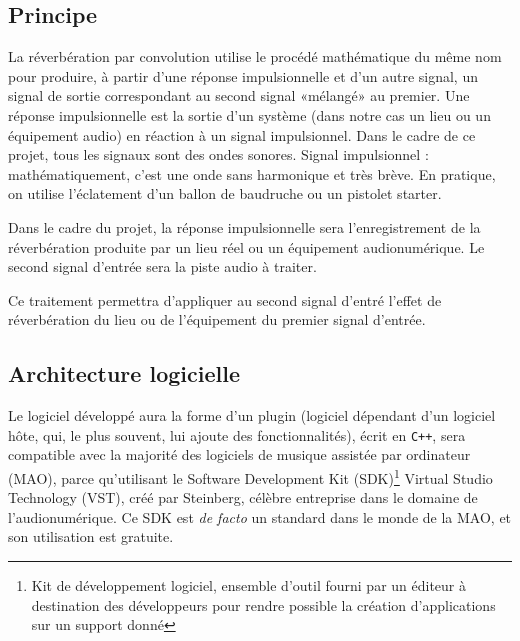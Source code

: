 %
\subsection{Principe}
La réverbération par convolution utilise le procédé mathématique du même nom pour produire, à partir d'une réponse impulsionnelle et d'un autre signal, un signal de sortie correspondant au second signal «mélangé» au premier.
Une réponse impulsionnelle est la sortie d'un système (dans notre cas un lieu ou un équipement audio) en réaction à un signal impulsionnel. Dans le cadre de ce projet, tous les signaux sont des ondes sonores.
Signal impulsionnel : mathématiquement, c'est une onde sans harmonique et très brève. En pratique, on utilise l'éclatement d'un ballon de baudruche ou un pistolet starter.

Dans le cadre du projet, la réponse impulsionnelle sera l'enregistrement de la réverbération produite par un lieu réel ou un équipement audionumérique.
Le second signal d'entrée sera la piste audio à traiter.

Ce traitement permettra d'appliquer au second signal d'entré l'effet de réverbération du lieu ou de l'équipement du premier signal d'entrée.



\subsection{Architecture logicielle}
Le logiciel développé aura la forme d'un plugin (logiciel dépendant d'un logiciel hôte, qui, le plus souvent, lui ajoute des fonctionnalités), écrit en {\tt C++}, sera compatible avec la majorité des logiciels de musique assistée par ordinateur (MAO), parce qu'utilisant le Software Development Kit (SDK)\footnote{Kit de développement logiciel, ensemble d'outil fourni par un éditeur à destination des développeurs pour rendre possible la création d'applications sur un support donné}  Virtual Studio Technology (VST), créé par Steinberg, célèbre entreprise dans le domaine de l'audionumérique. Ce SDK est \emph{de facto} un standard dans le monde de la MAO, et son utilisation est gratuite.

